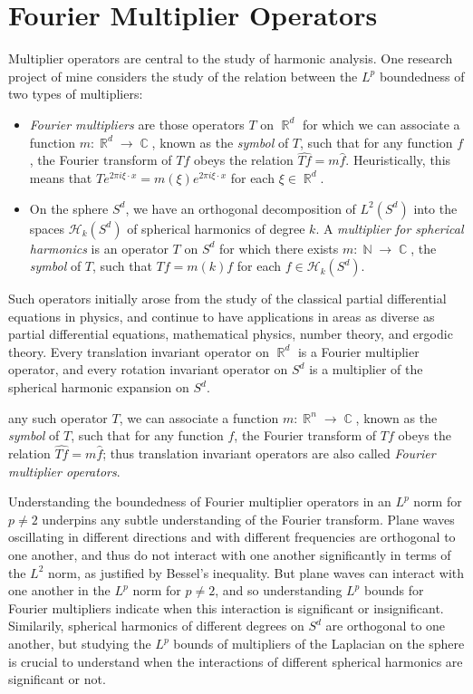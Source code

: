 \documentclass[12pt]{article}
\DeclareMathOperator{\RR}{\mathbb{R}}
\DeclareMathOperator{\NN}{\mathbb{N}}
\DeclareMathOperator{\CC}{\mathbb{C}}
\begin{document}
\section*{Fourier Multiplier Operators}

Multiplier operators are central to the study of harmonic analysis. One research project of mine considers the study of the relation between the $L^p$ boundedness of two types of multipliers:
%
\begin{itemize}
	\item \emph{Fourier multipliers} are those operators $T$ on $\RR^d$ for which we can associate a function $m: \RR^d \to \CC$, known as the \emph{symbol} of $T$, such that for any function $f$, the Fourier transform of $Tf$ obeys the relation $\widehat{Tf} = m \widehat{f}$. Heuristically, this means that $T e^{2 \pi i \xi \cdot x} = m(\xi) e^{2 \pi i \xi \cdot x}$ for each $\xi \in \RR^d$.

	\item On the sphere $S^d$, we have an orthogonal decomposition of $L^2(S^d)$ into the spaces $\mathcal{H}_k(S^d)$ of spherical harmonics of degree $k$. A \emph{multiplier for spherical harmonics} is an operator $T$ on $S^d$ for which there exists $m: \NN \to \CC$, the \emph{symbol} of $T$, such that $Tf = m(k) f$ for each $f \in \mathcal{H}_k(S^d)$.
\end{itemize}

 Such operators initially arose from the study of the classical partial differential equations in physics, and continue to have applications in areas as diverse as partial differential equations, mathematical physics, number theory, and ergodic theory. Every translation invariant operator on $\RR^d$ is a Fourier multiplier operator, and every rotation invariant operator on $S^d$ is a multiplier of the spherical harmonic expansion on $S^d$.

any such operator $T$, we can associate a function $m: \RR^n \to \CC$, known as the \emph{symbol} of $T$, such that for any function $f$, the Fourier transform of $Tf$ obeys the relation $\widehat{Tf} = m \widehat{f}$; thus translation invariant operators are also called \emph{Fourier multiplier operators}.

Understanding the boundedness of Fourier multiplier operators in an $L^p$ norm for $p \neq 2$ underpins any subtle understanding of the Fourier transform. Plane waves oscillating in different directions and with different frequencies are orthogonal to one another, and thus do not interact with one another significantly in terms of the $L^2$ norm, as justified by Bessel's inequality. But plane waves can interact with one another in the $L^p$ norm for $p \neq 2$, and so understanding $L^p$ bounds for Fourier multipliers indicate when this interaction is significant or insignificant. Similarily, spherical harmonics of different degrees on $S^d$ are orthogonal to one another, but studying the $L^p$ bounds of multipliers of the Laplacian on the sphere is crucial to understand when the interactions of different spherical harmonics are significant or not.
\end{document}
